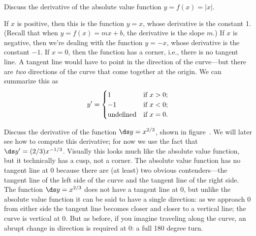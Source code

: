 \begin{example}
  Discuss the derivative of the absolute value function $y=f(x)=|x|$.

If $x$ is positive, then this is the function $y=x$, whose derivative is
the constant 1.  (Recall that when $y=f(x)=mx+b$, the derivative is the
slope $m$.)  If $x$ is negative, then we're dealing with the function $y=-x$,
whose derivative is the constant $-1$.  If $x=0$, then the function has
a corner, i.e., there is no tangent line.  A tangent line 
would have to point in the direction of the curve---but there are {\it
two} directions of the curve that come together at the origin.  We can
summarize this as
$$ 
y'= \begin{cases}
1&\mbox{if $x>0$;} \\
-1&\mbox{if $x<0$;} \\
\hbox{undefined}&\mbox{if $x=0$.}
\end{cases}
$$

\end{example}

\begin{example}

Discuss the derivative of the function $\ds y=x^{2/3}$, shown in
figure~. We will later see how to compute this
derivative; for now we use the fact that $\ds
y'=(2/3)x^{-1/3}$. Visually this looks much like the absolute value
function, but it technically has a cusp, not a corner. The absolute
value function has no tangent line at 0 because there are (at least)
two obvious contenders---the tangent line of the left side of the
curve and the tangent line of the right side.
The function $\ds y=x^{2/3}$ does not have a tangent line at 0, but
unlike the absolute value function it can be said to have a single
direction: as we approach 0 from either side the tangent line becomes
closer and closer to a vertical line; the curve is vertical at 0. But
as before, if you imagine traveling along the curve, an abrupt change
in direction is required at 0: a full 180 degree turn.  \end{example}


